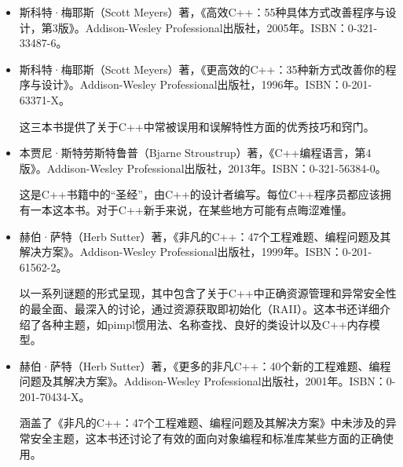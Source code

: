 \begin{itemize}
\item
斯科特·梅耶斯（Scott Meyers）著，《高效C++：55种具体方式改善程序与设计，第3版》。Addison-Wesley Professional出版社，2005年。ISBN：0-321-33487-6。

\item
斯科特·梅耶斯（Scott Meyers）著，《更高效的C++：35种新方式改善你的程序与设计》。Addison-Wesley Professional出版社，1996年。ISBN：0-201-63371-X。

\hspace*{\fill}

这三本书提供了关于C++中常被误用和误解特性方面的优秀技巧和窍门。

\hspace*{\fill}

\item
本贾尼·斯特劳斯特鲁普（Bjarne Stroustrup）著，《C++编程语言，第4版》。Addison-Wesley Professional出版社，2013年。ISBN：0-321-56384-0。

\hspace*{\fill}

这是C++书籍中的“圣经”，由C++的设计者编写。每位C++程序员都应该拥有一本这本书。对于C++新手来说，在某些地方可能有点晦涩难懂。

\hspace*{\fill}

\item
赫伯·萨特（Herb Sutter）著，《非凡的C++：47个工程难题、编程问题及其解决方案》。Addison-Wesley Professional出版社，1999年。ISBN：0-201-61562-2。

\hspace*{\fill}

以一系列谜题的形式呈现，其中包含了关于C++中正确资源管理和异常安全性的最全面、最深入的讨论，通过资源获取即初始化（RAII）。这本书还详细介绍了各种主题，如pimpl惯用法、名称查找、良好的类设计以及C++内存模型。

\hspace*{\fill}

\item
赫伯·萨特（Herb Sutter）著，《更多的非凡C++：40个新的工程难题、编程问题及其解决方案》。Addison-Wesley Professional出版社，2001年。ISBN：0-201-70434-X。

\hspace*{\fill}

涵盖了《非凡的C++：47个工程难题、编程问题及其解决方案》中未涉及的异常安全主题，这本书还讨论了有效的面向对象编程和标准库某些方面的正确使用。

\hspace*{\fill}


\end{itemize}
